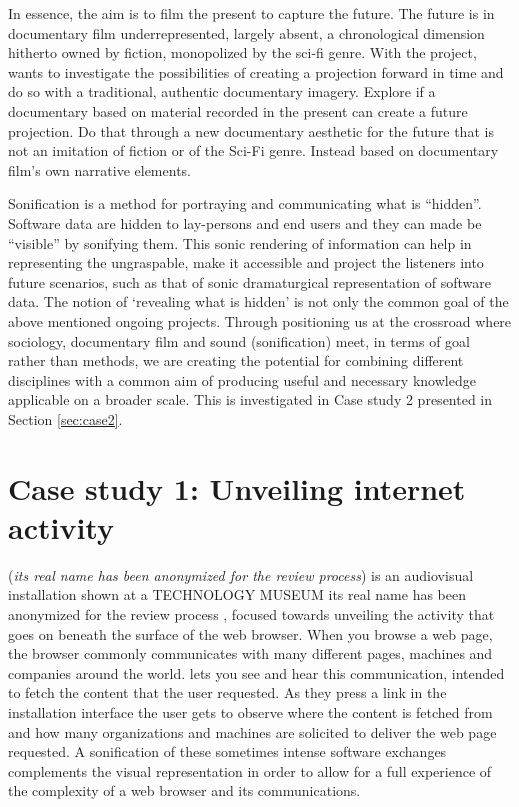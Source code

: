 \documentclass[manuscript,screen]{acmart}
\begin{document}
In essence, the aim is to film the present to capture the future. The future is in documentary film  underrepresented, largely absent, a chronological dimension hitherto owned by fiction, monopolized by the sci-fi genre. With the project, \Gandini  wants to investigate the possibilities of creating a projection forward in time and do so with a traditional, authentic documentary imagery. Explore if a documentary based on material recorded in the present can create a future projection. Do that through a new documentary aesthetic for the future that is not an imitation of fiction or of the Sci-Fi genre. Instead based on documentary film's own narrative elements.

Sonification is a method for portraying and communicating what is ``hidden''. Software data are hidden to lay-persons and end users and they can made be ``visible'' by sonifying them. This sonic rendering of information can help in representing the ungraspable, make it accessible and project the listeners into future scenarios, such as that of sonic dramaturgical representation of software data.  
The notion of ‘revealing what is hidden’ is not only the common goal of the above mentioned ongoing projects. Through positioning us at the crossroad where sociology, documentary film and sound (sonification)  meet, in terms of goal rather than methods, we are creating the potential for combining different disciplines with a common aim of producing useful and necessary knowledge applicable on a broader scale. This is investigated in Case study 2 presented in Section \ref{sec:case2}.
  

\section{Case study 1: Unveiling internet activity}\label{sec:case1}

\Pellow (\textit{its real name has been anonymized for the review process}) is an audiovisual installation shown at a TECHNOLOGY MUSEUM {its real name has been anonymized for the review process}
, focused towards unveiling the activity that goes on beneath the surface of the web browser. When you browse a web page, the browser commonly communicates with many different pages, machines and companies around the world. \Pellow lets you see and hear this communication, intended to fetch the content that the user requested. As they press a link in the installation interface the user gets to observe where the content is fetched from and how many organizations and machines are solicited to deliver the web page requested. A sonification of these sometimes intense software exchanges complements the visual representation in order to allow for a full experience of the complexity of a web browser and its communications.
\end{document}
